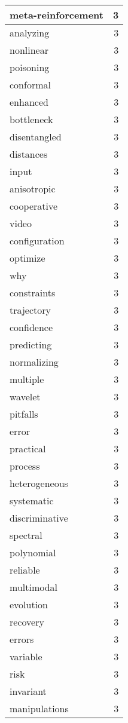\begin{table}[h]
\begin{tabular}{|l|r|}
\hline
meta-reinforcement & 3 \\
\hline
analyzing & 3 \\
\hline
nonlinear & 3 \\
\hline
poisoning & 3 \\
\hline
conformal & 3 \\
\hline
enhanced & 3 \\
\hline
bottleneck & 3 \\
\hline
disentangled & 3 \\
\hline
distances & 3 \\
\hline
input & 3 \\
\hline
anisotropic & 3 \\
\hline
cooperative & 3 \\
\hline
video & 3 \\
\hline
configuration & 3 \\
\hline
optimize & 3 \\
\hline
why & 3 \\
\hline
constraints & 3 \\
\hline
trajectory & 3 \\
\hline
confidence & 3 \\
\hline
predicting & 3 \\
\hline
normalizing & 3 \\
\hline
multiple & 3 \\
\hline
wavelet & 3 \\
\hline
pitfalls & 3 \\
\hline
error & 3 \\
\hline
practical & 3 \\
\hline
process & 3 \\
\hline
heterogeneous & 3 \\
\hline
systematic & 3 \\
\hline
discriminative & 3 \\
\hline
spectral & 3 \\
\hline
polynomial & 3 \\
\hline
reliable & 3 \\
\hline
multimodal & 3 \\
\hline
evolution & 3 \\
\hline
recovery & 3 \\
\hline
errors & 3 \\
\hline
variable & 3 \\
\hline
risk & 3 \\
\hline
invariant & 3 \\
\hline
manipulations & 3 \\

\end{tabular}
\end{table}
